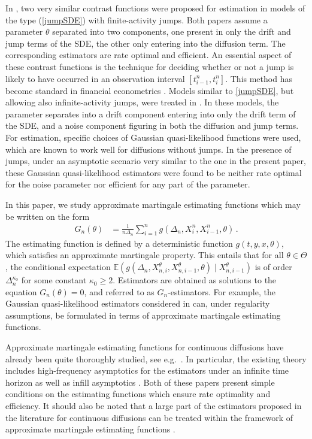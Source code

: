 \documentclass[11pt,a4paper]{article}
\newcommand{\xtl}{{X^n_{i-1}}}
\newcommand{\xtr}{X^n_i}
\newcommand{\tminus}{{t_{i-1}^n}}
\newcommand{\tplus}{{t_i^n}}
\newcommand{\EE}{{\mathbb E}}
\numberwithin{equation}{section}
\numberwithin{theorem}{section}
\begin{document}
In \cite{shimizu2006, ogihara2011}, two very similar contrast functions were proposed for estimation in models of the type (\ref{jumpSDE}) with finite-activity jumps. Both papers assume a parameter $\theta$ separated into two components, one present in only the drift and jump terms of the SDE, the other only entering into the diffusion term. The corresponding estimators are rate optimal and efficient. An essential aspect of these contrast functions is the technique for deciding whether or not a jump is likely to have occurred in an observation interval $[\tminus,\tplus]$. This method has become standard in financial econometrics \cite{mancini2001, lee2008}. Models similar to \eqref{jumpSDE}, but allowing also infinite-activity jumps, were treated in \cite{masuda2011, masuda2013}. In these models, the parameter separates into a drift component entering into only the drift term of the SDE, and a noise component figuring in both the diffusion and jump terms. For estimation, specific choices of Gaussian quasi-likelihood functions were used, which are known to work well for diffusions without jumps. In the presence of jumps, under an asymptotic scenario very similar to the one in the present paper, these Gaussian quasi-likelihood estimators were found to be neither rate optimal for the noise parameter nor efficient for any part of the parameter. \medskip

In this paper, we study approximate martingale estimating functions which may be written on the form
%
\begin{align}
G_n(\theta) &= \frac{1}{n\Delta_n}\sum_{i=1}^n g(\Delta_n,\xtr,\xtl,\theta)\,.
\label{GnDef}
\end{align}
%
The estimating function is defined by a deterministic function $g(t,y,x, \theta)$, which satisfies an approximate martingale property. This entails that for all $\theta \in \Theta$, the conditional expectation $\EE(g(\Delta_n,X^\theta_{n,i}, X^\theta_{n,i-1}, \theta)\mid X^\theta_{n,i-1})$ is of order $\Delta_n^{\kappa_0}$ for some constant $\kappa_0\geq 2$. Estimators are obtained as solutions to the equation $G_n(\theta)=0$, and referred to as $G_n$-estimators. For example, the Gaussian quasi-likelihood estimators considered in \cite{masuda2011, masuda2013} can, under regularity assumptions, be formulated in terms of approximate martingale estimating functions. \medskip

Approximate martingale estimating functions for continuous diffusions have already been quite thoroughly studied, see e.g.\ \cite{bibby1995, kessler1999, jacobsen2001, jacobsen2002, uchida2004, efficient, jakobsen2017}. In particular, the existing theory includes high-frequency asymptotics for the estimators under an infinite time horizon \cite{efficient} as well as infill asymptotics \cite{jakobsen2017}. Both of these papers present simple conditions on the estimating functions which ensure rate optimality and efficiency. It should also be noted that a large part of the estimators proposed in the literature for continuous diffusions can be treated within the framework of approximate martingale estimating functions \cite{efficient}. \medskip
\end{document}
